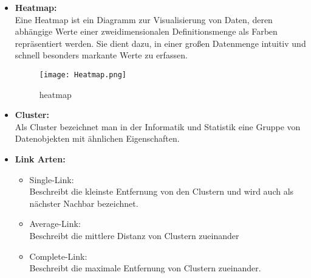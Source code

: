 \begin{itemize}
\begin{itemize}
\end{itemize}
\item \textbf{Heatmap:}\\
Eine Heatmap  ist ein Diagramm zur Visualisierung von Daten, deren abhängige Werte einer zweidimensionalen Definitionsmenge als Farben repräsentiert werden. Sie dient dazu, in einer großen Datenmenge intuitiv und schnell besonders markante Werte zu erfassen.
\begin{figure}[H]
\texttt{[image: Heatmap.png]}
\caption{heatmap}
\label{}
\end{figure}
\item \textbf{Cluster:}\\
Als Cluster bezeichnet man in der Informatik und Statistik eine Gruppe von Datenobjekten mit ähnlichen Eigenschaften.
\item \textbf{Link Arten:}
\begin{itemize}
		\item Single-Link:\\ Beschreibt die kleinste Entfernung von den Clustern und wird auch als nächster Nachbar bezeichnet.
		\item Average-Link:\\Beschreibt die mittlere Distanz von Clustern zueinander
		\item Complete-Link:\\ Beschreibt die maximale Entfernung von Clustern zueinander.
\end{itemize}
\end{itemize}
